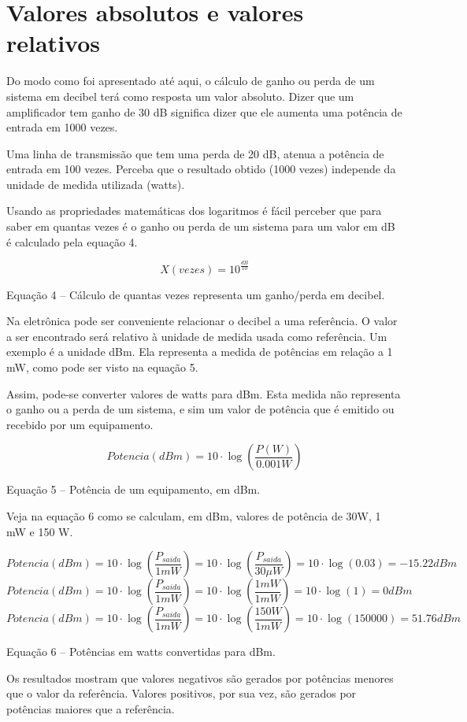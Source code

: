 \section{Valores absolutos e valores relativos}
Do modo como foi apresentado até aqui, o cálculo de ganho ou perda de um sistema em decibel terá como resposta um valor absoluto. Dizer que um amplificador tem ganho de 30 dB significa dizer que ele aumenta uma potência de entrada em 1000 vezes.

Uma linha de transmissão que tem uma perda de 20 dB, atenua a potência de entrada em 100 vezes. Perceba que o resultado obtido (1000 vezes) independe da unidade de medida utilizada (watts).

Usando as propriedades matemáticas dos logaritmos é fácil perceber que para saber em quantas vezes é o ganho ou perda de um sistema para um valor em dB é calculado pela equação 4.

$$
X(vezes)= 10^{\frac{dB}{10}}
$$

\begin{center}
    Equação 4 – Cálculo de quantas vezes representa um ganho/perda em decibel.
\end{center}

Na eletrônica pode ser conveniente relacionar o decibel a uma referência. O valor a ser encontrado será relativo à unidade de medida usada como referência. Um exemplo é a unidade dBm. Ela representa a medida de potências em relação a 1 mW, como pode ser visto na equação 5.

Assim, pode-se converter valores de watts para dBm. Esta medida não representa o ganho ou a perda de um sistema, e sim um valor de potência que é emitido ou recebido por um equipamento.

$$
Potencia(dBm)=10 \cdot \log\left (\frac{P(W)}{0.001W}\right )
$$

\begin{center}
    Equação 5 – Potência de um equipamento, em dBm.
\end{center}

Veja na equação 6 como se calculam, em dBm, valores de potência de 30W, 1 mW e 150 W.

$$
    Potencia(dBm)=10 \cdot \log\left (\frac{P_{saida}}{1mW}\right ) = 10 \cdot \log\left (\frac{P_{saida}}{30\mu W}\right ) = 10 \cdot \log\left (0.03 \right )=-15.22dBm
$$
$$
    Potencia(dBm)=10 \cdot \log\left (\frac{P_{saida}}{1mW}\right ) = 10 \cdot \log\left (\frac{1mW}{1mW}\right ) = 10 \cdot \log\left (1 \right )=0dBm
$$
$$
    Potencia(dBm)=10 \cdot \log\left (\frac{P_{saida}}{1mW}\right ) = 10 \cdot \log\left (\frac{150W}{1mW}\right ) = 10 \cdot \log\left (150000 \right )=51.76dBm
$$

\begin{center}
    Equação 6 – Potências em watts convertidas para dBm.
\end{center}

Os resultados mostram que valores negativos são gerados por potências menores que o valor da referência. Valores positivos, por sua vez, são gerados por potências maiores que a referência.
